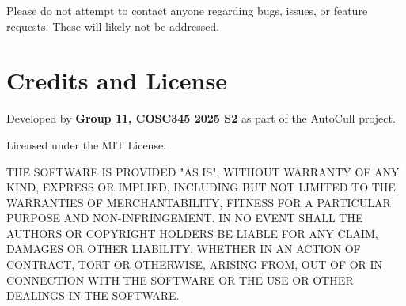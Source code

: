 \documentclass[12pt,a4paper]{article}
\begin{document}
Please do not attempt to contact anyone regarding bugs, issues, or feature requests. These will likely not be addressed.

\section{Credits and License}

Developed by \textbf{Group 11, COSC345 2025 S2} as part of the AutoCull project.  

Licensed under the MIT License.

THE SOFTWARE IS PROVIDED "AS IS", WITHOUT WARRANTY OF ANY KIND, EXPRESS OR IMPLIED, INCLUDING BUT NOT LIMITED TO THE WARRANTIES OF MERCHANTABILITY, FITNESS FOR A PARTICULAR PURPOSE AND NON-INFRINGEMENT. IN NO EVENT SHALL THE AUTHORS OR COPYRIGHT HOLDERS BE LIABLE FOR ANY CLAIM, DAMAGES OR OTHER LIABILITY, WHETHER IN AN ACTION OF CONTRACT, TORT OR OTHERWISE, ARISING FROM, OUT OF OR IN CONNECTION WITH THE SOFTWARE OR THE USE OR OTHER DEALINGS IN THE SOFTWARE.
\end{document}
